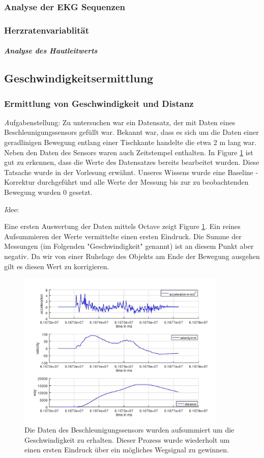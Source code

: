 \documentclass[12pt]{article}
\begin{document}
\subsubsection{Analyse der EKG Sequenzen}

\subsubsection{Herzratenvariablität}

\subparagraph{Analyse des Hautleitwerts}

\newpage
\subsection{Geschwindigkeitsermittlung}
\label{sec:Geschwindigkeitsermittlung}
\subsubsection{Ermittlung von Geschwindigkeit und Distanz}
\textit Aufgabenstellung:
Zu untersuchen war ein Datensatz, der mit Daten eines Beschleunigungssensors gefüllt war. Bekannt war, dass es sich um die Daten einer geradlinigen Bewegung entlang einer Tischkante handelte die etwa 2 m lang war. Neben den Daten des Sensors waren auch Zeitstempel enthalten. In Figure \ref{fig:plainData} ist gut zu erkennen, dass die Werte des Datensatzes bereits bearbeitet wurden. Diese Tatsache wurde in der Vorlesung erwähnt. Unseres Wissens wurde eine Baseline - Korrektur durchgeführt und alle Werte der Messung bis zur zu beobachtenden Bewegung wurden 0 gesetzt. 

\textit Idee:

Eine ersten Auswertung der Daten mittels Octave zeigt Figure \ref{fig:plainData}. Ein reines Aufsummieren der Werte vermittelte einen ersten Eindruck.
Die Summe der Messungen (im Folgenden "Geschwindigkeit" genannt) ist an diesem Punkt aber negativ. Da wir von einer Ruhelage des Objekts am Ende der Bewegung ausgehen gilt es diesen Wert zu korrigieren. 

\begin{figure}[H]
	\centering
	\includegraphics[width=10cm]{images/testData.jpg}
	\caption{Die Daten des Beschleunigungssensors wurden aufsummiert um die Geschwindigkeit zu erhalten. Dieser Prozess wurde wiederholt um einen ersten Eindruck über ein mögliches Wegsignal zu gewinnen.}
	\label{fig:plainData}
\end{figure}
\end{document}

